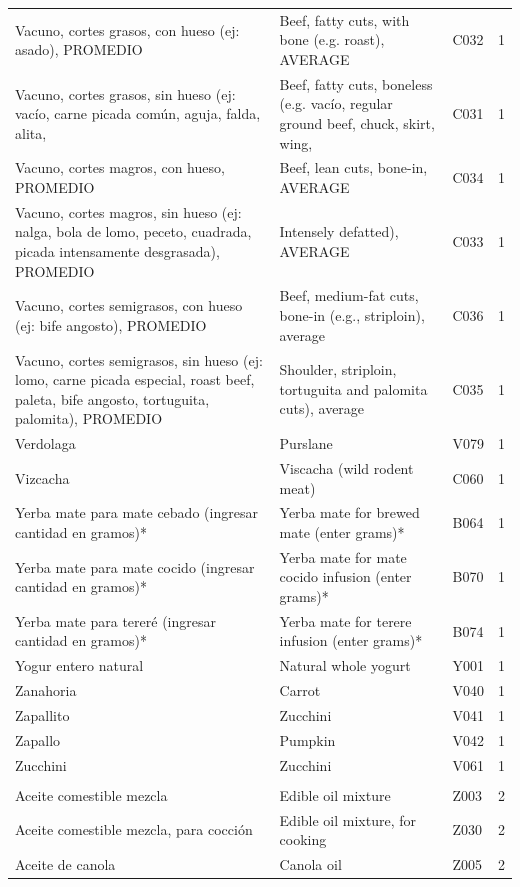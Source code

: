 {\begin{longtable}{p{4.3cm}p{5.5cm}p{1.5cm}p{0.7cm}}
Vacuno, cortes grasos, con hueso (ej: asado), PROMEDIO & Beef, fatty cuts, with bone (e.g. roast), AVERAGE & C032 & 1\\
Vacuno, cortes grasos, sin hueso (ej: vacío, carne picada común, aguja, falda, alita, & Beef, fatty cuts, boneless (e.g. vacío, regular ground beef, chuck, skirt, wing, & C031 & 1\\
Vacuno, cortes magros, con hueso, PROMEDIO & Beef, lean cuts, bone-in, AVERAGE & C034 & 1\\
Vacuno, cortes magros, sin hueso (ej: nalga, bola de lomo, peceto, cuadrada, picada intensamente desgrasada), PROMEDIO & Intensely defatted), AVERAGE & C033 & 1\\
Vacuno, cortes semigrasos, con hueso (ej: bife angosto), PROMEDIO & Beef, medium-fat cuts, bone-in (e.g., striploin), average & C036 & 1\\
Vacuno, cortes semigrasos, sin hueso (ej: lomo, carne picada especial, roast beef, paleta, bife angosto, tortuguita, palomita), PROMEDIO & Shoulder, striploin, tortuguita and palomita cuts), average & C035 & 1\\
Verdolaga & Purslane & V079 & 1\\
Vizcacha & Viscacha (wild rodent meat) & C060 & 1\\
Yerba mate para mate cebado (ingresar cantidad en gramos)* & Yerba mate for brewed mate (enter grams)* & B064 & 1\\
Yerba mate para mate cocido (ingresar cantidad en gramos)* & Yerba mate for mate cocido infusion (enter grams)* & B070 & 1\\
Yerba mate para tereré (ingresar cantidad en gramos)* & Yerba mate for terere infusion (enter grams)* & B074 & 1\\
Yogur entero natural & Natural whole yogurt & Y001 & 1\\
Zanahoria & Carrot & V040 & 1\\
Zapallito & Zucchini & V041 & 1\\
Zapallo & Pumpkin & V042 & 1\\
Zucchini & Zucchini & V061 & 1\\
\addlinespace
\multicolumn{4}{l}{\textbf{NOVA 2. Processed culinary ingredients}}\\
Aceite comestible mezcla & Edible oil mixture & Z003 & 2\\
Aceite comestible mezcla, para cocción & Edible oil mixture, for cooking & Z030 & 2\\
Aceite de canola & Canola oil & Z005 & 2\\

\end{longtable}}
